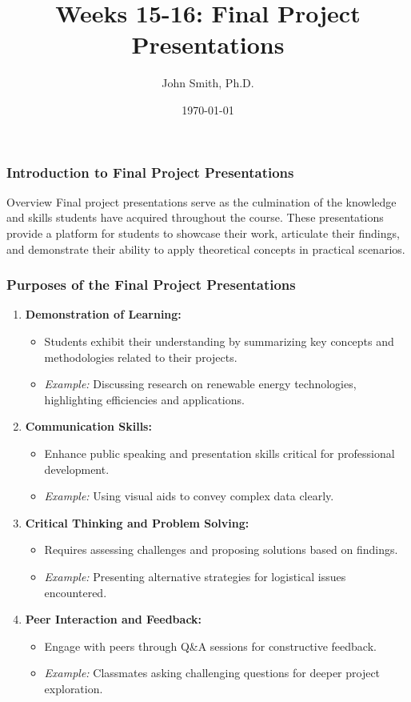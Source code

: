 \documentclass[aspectratio=169]{beamer}
\title[Final Project Presentations]{Weeks 15-16: Final Project Presentations}
\author[J. Smith]{John Smith, Ph.D.}
\institute[University Name]{
  Department of Computer Science\\
  University Name\\
  \vspace{0.3cm}
  Email: email@university.edu\\
  Website: www.university.edu
}
\date{\today}
\begin{document}
\frame{\titlepage}

\begin{frame}[fragile]
    \frametitle{Introduction to Final Project Presentations}
    \begin{block}{Overview}
        Final project presentations serve as the culmination of the knowledge and skills students have acquired throughout the course. These presentations provide a platform for students to showcase their work, articulate their findings, and demonstrate their ability to apply theoretical concepts in practical scenarios.
    \end{block}
\end{frame}

\begin{frame}[fragile]
    \frametitle{Purposes of the Final Project Presentations}
    \begin{enumerate}
        \item \textbf{Demonstration of Learning:}
        \begin{itemize}
            \item Students exhibit their understanding by summarizing key concepts and methodologies related to their projects.
            \item \textit{Example:} Discussing research on renewable energy technologies, highlighting efficiencies and applications.
        \end{itemize}
        
        \item \textbf{Communication Skills:}
        \begin{itemize}
            \item Enhance public speaking and presentation skills critical for professional development.
            \item \textit{Example:} Using visual aids to convey complex data clearly.
        \end{itemize}

        \item \textbf{Critical Thinking and Problem Solving:}
        \begin{itemize}
            \item Requires assessing challenges and proposing solutions based on findings.
            \item \textit{Example:} Presenting alternative strategies for logistical issues encountered.
        \end{itemize}

        \item \textbf{Peer Interaction and Feedback:}
        \begin{itemize}
            \item Engage with peers through Q\&A sessions for constructive feedback.
            \item \textit{Example:} Classmates asking challenging questions for deeper project exploration.
        \end{itemize}
    \end{enumerate}
\end{frame}
\end{document}
